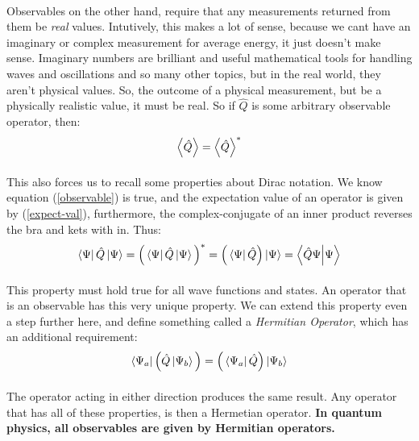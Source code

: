 \documentclass[12pt,letterpaper]{book}
\begin{document}
\paragraph*{}Observables on the other hand, require that any measurements returned from them be \textit{real} values. Intutively, this makes a lot of sense, because we cant have an imaginary or complex measurement for average energy, it just doesn't make sense. Imaginary numbers are brilliant and useful mathematical tools for handling waves and oscillations and so many other topics, but in the real world, they aren't physical values. So, the outcome of a physical measurement, but be a physically realistic value, it must be real. So if $\hat{Q}$ is some arbitrary observable operator, then:
\begin{equation}
\label{observable}
\expval{\hat{Q}} = \expval{\hat{Q}}^* 
\end{equation}
\paragraph*{}This also forces us to recall some properties about Dirac notation. We know equation (\ref{observable}) is true, and the expectation value of an operator is given by (\ref{expect-val}), furthermore, the complex-conjugate of an inner product reverses the bra and kets with in. Thus:
\begin{equation}
\bra{\Psi}\hat{Q}\ket{\Psi} = 
\Big(\bra{\Psi}\hat{Q}\ket{\Psi}\Big)^* = 
\Big(\bra{\Psi}\hat{Q}\Big)\ket{\Psi} = 
\bra{\hat{Q}\Psi}\ket{\Psi}
\end{equation}
\paragraph*{}This property must hold true for all wave functions and states. An operator that is an observable has this very unique property. We can extend this property even a step further here, and define something called a \textit{Hermitian Operator}, which has an additional requirement:
\begin{equation}
\bra{\Psi_a}\Big(\hat{Q}\ket{\Psi_b}\Big) = 
\Big(\bra{\Psi_a}\hat{Q}\Big)\ket{\Psi_b}
\end{equation}
\paragraph*{}The operator acting in either direction produces the same result. Any operator that has all of these properties, is then a Hermetian operator. \textbf{In quantum physics, all observables are given by Hermitian operators.}
\end{document}
